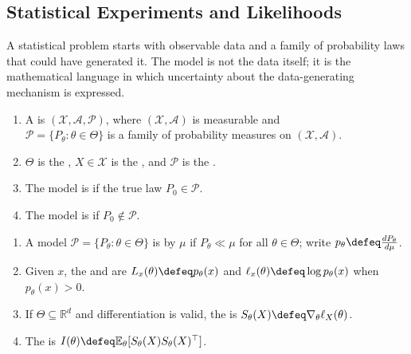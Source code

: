 \subsection{Statistical Experiments and Likelihoods}

A statistical problem starts with observable data and a family of probability laws that could have generated it.  The model is not the data itself; it is the mathematical language in which uncertainty about the data-generating mechanism is expressed.

\begin{definition} \label{def:statistical-experiment-and-model} 
\begin{enumerate}[label=(\roman*)]
\setlength{\itemsep}{0pt}
\item A  is $(\mathcal{X},\mathcal{A},\mathcal{P})$, where $(\mathcal{X},\mathcal{A})$ is measurable and\\
$\mathcal{P}=\{P_\theta:\theta\in\Theta\}$ is a family of probability measures on $(\mathcal{X},\mathcal{A})$.
\item $\Theta$ is the , $X\in\mathcal{X}$ is the , and $\mathcal{P}$ is the .
\item The model is  if the true law $P_0\in\mathcal{P}$.
\item The model is  if $P_0\notin\mathcal{P}$.
\end{enumerate}
\end{definition}

\begin{definition} \label{def:dominated-model-likelihood-score-information} 
\begin{enumerate}[label=(\roman*)]
\setlength{\itemsep}{0pt}
\item A model $\mathcal{P}=\{P_\theta:\theta\in\Theta\}$ is  by $\mu$ if $P_\theta\ll\mu$ for all $\theta\in\Theta$; write $p_\theta\defeq \frac{dP_\theta}{d\mu}$.
\item Given $x$, the  and  are $L_x(\theta)\defeq p_\theta(x)$ and $\ell_x(\theta)\defeq\log p_\theta(x)$ when $p_\theta(x)>0$.
\item If $\Theta\subseteq\mathbb{R}^d$ and differentiation is valid, the  is $S_\theta(X)\defeq\nabla_\theta\ell_X(\theta)$.
\item The  is $I(\theta)\defeq\mathbb{E}_\theta[S_\theta(X)S_\theta(X)^\top]$.
\end{enumerate}
\end{definition}

